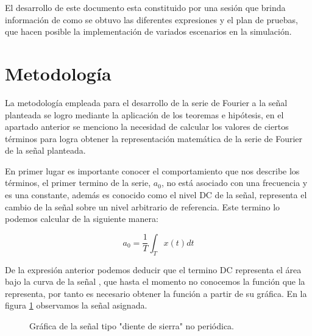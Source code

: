 \documentclass[11pt,a4paper,twocolumn]{article}
\begin{document}
    El desarrollo de este documento esta constituido por una sesión que brinda información 
    de como se obtuvo las diferentes expresiones y el plan de pruebas, que hacen posible la 
    implementación de variados escenarios en la simulación.
   
\section{Metodología}
    La metodología empleada para el desarrollo de la serie de Fourier a la señal planteada se 
    logro mediante la aplicación de los teoremas e hipótesis, en el apartado anterior se menciono 
    la necesidad de calcular los valores de ciertos términos para logra obtener la representación 
    matemática de la serie de Fourier de la señal planteada. 
    
    En primer lugar es importante conocer el comportamiento que nos describe los términos, el primer 
    termino de la serie, $a_{0}$, no está asociado con una frecuencia y es una constante, además es 
    conocido como el nivel DC de la señal, representa el cambio de la señal sobre un nivel arbitrario 
    de referencia. Este termino lo podemos calcular de la siguiente manera:

    \begin{equation}
        a_{0}=\frac{1}{T} \int_{T}^{} x(t)dt
        \label{equation2}
    \end{equation}
    
    De la expresión anterior podemos deducir que el termino DC representa el área bajo la curva de la 
    señal \cite{diapositivas}, que hasta el momento no conocemos la función que la representa, por tanto es necesario obtener 
    la función a partir de su gráfica. En la figura \ref{funcionAsiganda} observamos la señal asignada.

    \begin{figure}[H]
        \centering
        \caption{Gráfica de la señal tipo "diente de sierra" no periódica.}
        \label{funcionAsiganda}
    \end{figure}
\end{document}
